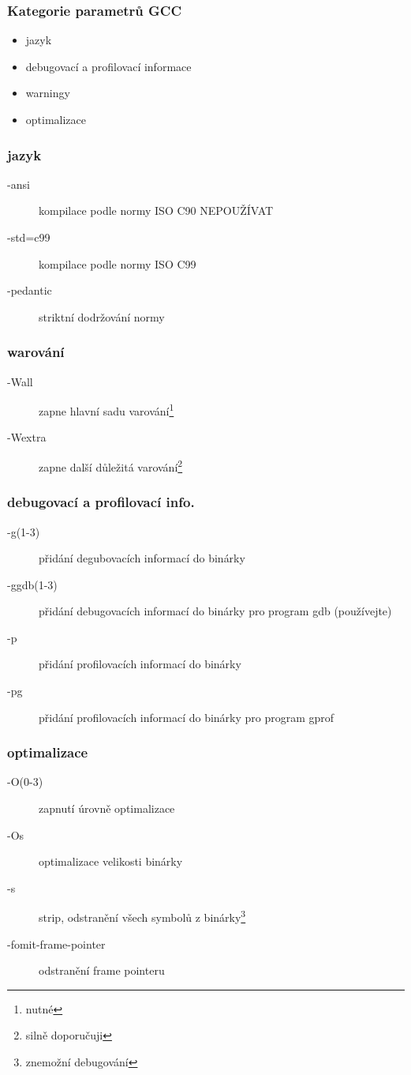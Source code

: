 	\begin{frame}
		\frametitle{Kategorie parametrů GCC}
		\begin{itemize}
			\item{jazyk}
			\item{debugovací a profilovací informace}
			\item{warningy}
			\item{optimalizace}
		\end{itemize}
	\end{frame}

	\begin{frame}
		\frametitle{jazyk}
		\begin{description}
			\item[-ansi]{kompilace podle normy ISO C90 \alert{NEPOUŽÍVAT}}
			\item[-std=c99]{kompilace podle normy ISO C99}
			\item[-pedantic]{striktní dodržování normy}
		\end{description}
	\end{frame}

	\begin{frame}
		\frametitle{warování}
		\begin{description}
			\item[-Wall]{zapne hlavní sadu varování\footnote{\alert{nutné}}}
			\item[-Wextra]{zapne další důležitá varování\footnote{silně doporučuji}} 
		\end{description}
	\end{frame}

	\begin{frame}
		\frametitle{debugovací a profilovací info.}
		\begin{description}
			\item[-g(1-3)]{přidání degubovacích informací do binárky}
			\item[-ggdb(1-3)]{přidání debugovacích informací do binárky pro program gdb (používejte)}
			\item[-p]{přidání profilovacích informací do binárky}
			\item[-pg]{přidání profilovacích informací do binárky pro program gprof}
		\end{description}
	\end{frame}

	\begin{frame}
		\frametitle{optimalizace}
		\begin{description}
			\item[-O(0-3)]{zapnutí úrovně optimalizace}
			\item[-Os]{optimalizace velikosti binárky}
			\item[-s]{strip, odstranění všech symbolů z binárky\footnote[1]{\alert{znemožní debugování}}}
			\item[-fomit-frame-pointer]{odstranění frame pointeru\footnotemark[1]}
		\end{description}
	\end{frame}

